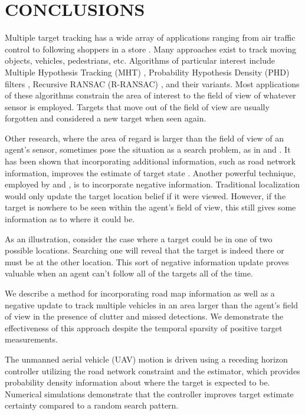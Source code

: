 \documentclass[letterpaper, 10 pt, conference]{ieeeconf}  %
\begin{document}
\section{CONCLUSIONS}\label{conclusions}

Multiple target tracking has a wide array of applications ranging from air traffic control \cite{Li1993} to following shoppers in a store \cite{Liu2007}. Many approaches exist to track moving objects, vehicles, pedestrians, etc. Algorithms of particular interest include Multiple Hypothesis Tracking (MHT) \cite{Reid1979}, Probability Hypothesis Density (PHD) filters \cite{Clark2007}, Recursive RANSAC (R-RANSAC) \cite{Niedfeldt2014}, and their variants. Most applications of these algorithms constrain the area of interest to the field of view of whatever sensor is employed. Targets that move out of the field of view are usually forgotten and considered a new target when seen again.

Other research, where the area of regard is larger than the field of view of an agent's sensor, sometimes pose the situation as a search problem, as in \cite{Allik2017} and \cite{Wong2005}. It has been shown that incorporating additional information, such as road network information, improves the estimate of target state \cite{Cheng2007}. Another powerful technique, employed by \cite{Allik2017} and \cite{Ahmed2017}, is to incorporate negative information. Traditional localization would only update the target location belief if it were viewed. However, if the target is nowhere to be seen within the agent's field of view, this still gives some information as to where it could be.

As an illustration, consider the case where a target could be in one of two possible locations. Searching one will reveal that the target is indeed there or must be at the other location. This sort of negative information update proves valuable when an agent can't follow all of the targets all of the time.

We describe a method for incorporating road map information as well as a negative update to track multiple vehicles in an area larger than the agent's field of view in the presence of clutter and missed detections. We demonstrate the effectiveness of this approach despite the temporal sparsity of positive target measurements.

The unmanned aerial vehicle (UAV) motion is driven using a receding horizon controller utilizing the road network constraint and the estimator, which provides probability density information about where the target is expected to be. Numerical simulations demonstrate that the controller improves target estimate certainty compared to a random search pattern.
\end{document}

